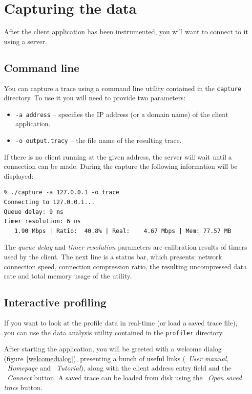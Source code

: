 \documentclass[hidelinks,titlepage,a4paper]{article}
\begin{document}
\section{Capturing the data}
\label{capturing}

After the client application has been instrumented, you will want to connect to it using a server.

\subsection{Command line}

You can capture a trace using a command line utility contained in the \texttt{capture} directory. To use it you will need to provide two parameters:

\begin{itemize}
\item \texttt{-a address} -- specifies the IP address (or a domain name) of the client application.
\item \texttt{-o output.tracy} -- the file name of the resulting trace.
\end{itemize}

If there is no client running at the given address, the server will wait until a connection can be made. During the capture the following information will be displayed:

\begin{verbatim}
% ./capture -a 127.0.0.1 -o trace
Connecting to 127.0.0.1...
Queue delay: 9 ns
Timer resolution: 6 ns
   1.90 Mbps | Ratio:  40.8% | Real:    4.67 Mbps | Mem: 77.57 MB
\end{verbatim}

The \emph{queue delay} and \emph{timer resolution} parameters are calibration results of timers used by the client. The next line is a status bar, which presents: network connection speed, connection compression ratio, the resulting uncompressed data rate and total memory usage of the utility.

\subsection{Interactive profiling}
\label{interactiveprofiling}

If you want to look at the profile data in real-time (or load a saved trace file), you can use the data analysis utility contained in the \texttt{profiler} directory.

After starting the application, you will be greeted with a welcome dialog (figure~\ref{welcomedialog}), presenting a bunch of useful links (\faBook{}~\emph{User manual}, \faGlobeAmericas{}~\emph{Homepage} and \faVideo{}~\emph{Tutorial}), along with the client address entry field and the \faWifi{}~\emph{Connect} button. A saved trace can be loaded from disk using the \faFolderOpen{}~\emph{Open saved trace} button.
\end{document}
